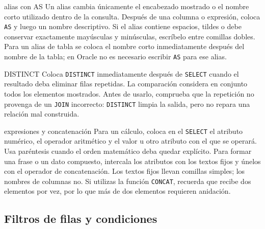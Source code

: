 \documentclass[11pt,a4paper]{article}
\newcommand{\campo}[1]{\texttt{#1}}
\begin{document}
\begin{plantilla}{alias con AS}
Un alias cambia únicamente el encabezado mostrado o el nombre corto utilizado dentro de la consulta.
Después de una columna o expresión, coloca \campo{AS} y luego un nombre descriptivo. Si el alias
contiene espacios, tildes o debe conservar exactamente mayúsculas y minúsculas, escríbelo entre
comillas dobles. Para un alias de tabla se coloca el nombre corto inmediatamente después del nombre
de la tabla; en Oracle no es necesario escribir \campo{AS} para ese alias.
\end{plantilla}

\begin{plantilla}{DISTINCT}
Coloca \campo{DISTINCT} inmediatamente después de \campo{SELECT} cuando el resultado deba eliminar
filas repetidas. La comparación considera en conjunto todos los elementos mostrados. Antes de usarlo,
comprueba que la repetición no provenga de un \campo{JOIN} incorrecto: \campo{DISTINCT} limpia la
salida, pero no repara una relación mal construida.
\end{plantilla}

\begin{plantilla}{expresiones y concatenación}
Para un cálculo, coloca en el \campo{SELECT} el atributo numérico, el operador aritmético y el valor u
otro atributo con el que se operará. Usa paréntesis cuando el orden matemático deba quedar explícito.
Para formar una frase o un dato compuesto, intercala los atributos con los textos fijos y únelos con
el operador de concatenación. Los textos fijos llevan comillas simples; los nombres de columnas no.
Si utilizas la función \campo{CONCAT}, recuerda que recibe dos elementos por vez, por lo que más de
dos elementos requieren anidación.
\end{plantilla}

\subsection{Filtros de filas y condiciones}
\end{document}
